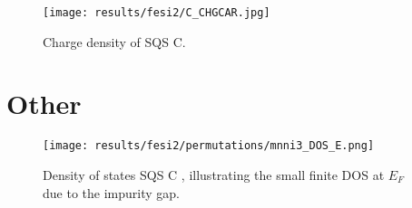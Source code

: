 \begin{figure}[H]
\texttt{[image: results/fesi2/C\_CHGCAR.jpg]}
\caption{Charge density of SQS C.}
\end{figure}


\section{Other}

\begin{figure}[H]
\texttt{[image: results/fesi2/permutations/mnni3\_DOS\_E.png]}
\caption{Density of states SQS C , illustrating the small finite DOS at $E_F$ due to the impurity gap.}
\end{figure}